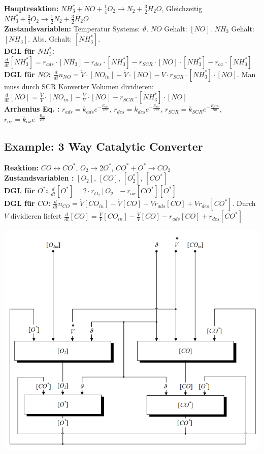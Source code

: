 \documentclass[10pt,a4paper]{scrartcl}
\begin{document}
\begin{multicols*}{3}
\textbf{Hauptreaktion:} $NH_3^*+NO+\frac{1}{4}O_2 \rightarrow N_2+\frac{3}{2}H_2O$, Gleichzeitig $NH_3^*+\frac{3}{4}O_2\rightarrow \frac{1}{2}N_2+\frac{3}{2}H_2O$\\
\textbf{Zustandsvariablen:} Temperatur Systems: $\vartheta$. $NO$ Gehalt: $[NO]$. $NH_3$ Gehalt: $[NH_3]$. Abs. Gehalt: $[NH_3^*]$.\\
\textbf{DGL f\"ur $NH_3^*$:} $\frac{d}{dt}[NH_3^*]=r_{ads}\cdot [NH_3]-r_{des}\cdot [NH_3^*]-r_{SCR}\cdot [NO]\cdot [NH_3^*]-r_{ox}\cdot [NH_3^*]$\\
\textbf{DGL f\"ur $NO$:} $\frac{d}{dt}n_{NO}=\dot{V}\cdot [NO_{in}]-\dot{V}\cdot [NO]-V\cdot r_{SCR}\cdot [NH_3^*]\cdot [NO]$. Man muss durch SCR Konverter Volumen dividieren: $\frac{d}{dt}[NO]=\frac{\dot{V}}{V}\cdot [NO_{in}]-\frac{\dot{V}}{V}\cdot [NO]-r_{SCR}\cdot [NH_3^*]\cdot [NO]$\\
\textbf{Arrhenius Eq. :} $r_{ads}=k_{ads}e^{-\frac{E_{ads}}{R\vartheta}}$, $r_{des}=k_{des}e^{-\frac{E_{des}}{R\vartheta}}$, $r_{SCR}=k_{SCR}e^{-\frac{E_{SCR}}{R\vartheta}}$, $r_{ox}=k_{ox}e^{-\frac{E_{ox}}{R\vartheta}}$

\subsection{Example: 3 Way Catalytic Converter}
\begin{minipage}{0.5\columnwidth}
\textbf{Reaktion:} $CO\leftrightarrow CO^*$, $O_2\rightarrow 2O^*$, $CO^*+O^*\rightarrow CO_2$\\
\textbf{Zustandsvariablen :} $[O_2]$, $[CO]$, $[O_2^*]$, $[CO^*]$\\
\textbf{DGL f\"ur $O^*$:} $\frac{d}{dt} [O^*]=2\cdot r_{O_2}[O_2]-r_{ox}[CO^*][O^*]$\\
\textbf{DGL f\"ur $CO$:} $\frac{d}{dt}n_{CO}=\dot{V}[CO_{in}]-\dot{V}[CO]-Vr_{ads}[CO]+Vr_{des}[CO^*]$. Durch $V$ dividieren liefert $\frac{d}{dt}[CO]=\frac{\dot{V}}{V}[CO_{in}]-\frac{\dot{V}}{V}[CO]-r_{ads}[CO]+r_{des}[CO^*]$
		        \end{minipage}
		\begin{minipage}{0.5\columnwidth}
		\begin{center}\includegraphics[width=0.67\columnwidth]{catal.png}\end{center}
           \end{minipage}
           

\end{multicols*}
\end{document}
